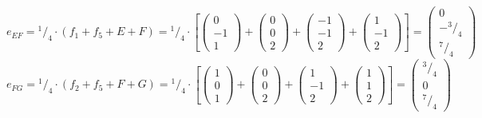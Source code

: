 \documentclass{article}
\newcommand*\rfrac[2]{{}^{#1}\!/_{#2}}%
\begin{document}
\[e_{EF}=\rfrac{1}{4}\cdot(f_1+f_5+E+F)=\rfrac{1}{4}\cdot\left[
\left({\begin{array}{c} 0 \\  -1 \\ 1 \end{array}}\right)+
\left({\begin{array}{c} 0 \\ 0 \\ 2 \end{array}}\right)+
\left({\begin{array}{c} -1 \\ -1 \\ 2 \end{array}}\right)+
\left({\begin{array}{c} 1 \\  -1 \\ 2 \end{array}}\right)\right]=
\left({\begin{array}{c}  0 \\ -\rfrac{3}{4} \\ \rfrac{7}{4} \end{array}}\right)
\]
\[e_{FG}=\rfrac{1}{4}\cdot(f_2+f_5+F+G)=\rfrac{1}{4}\cdot\left[
\left({\begin{array}{c} 1 \\  0 \\ 1 \end{array}}\right)+
\left({\begin{array}{c} 0 \\ 0 \\ 2 \end{array}}\right)+
\left({\begin{array}{c} 1 \\ -1 \\ 2 \end{array}}\right)+
\left({\begin{array}{c} 1 \\  1 \\ 2 \end{array}}\right)\right]=
\left({\begin{array}{c}  \rfrac{3}{4} \\ 0 \\ \rfrac{7}{4} \end{array}}\right)
\]
\end{document}
